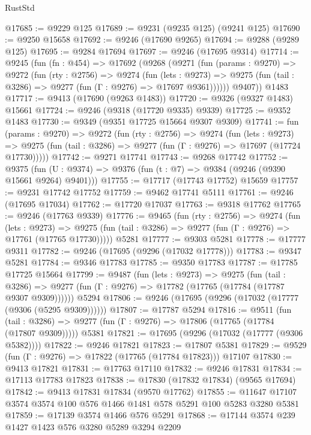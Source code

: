\begin{lexlean}{RustStd}
\begin{coremodule}
@17685 := @9229 @125
@17689 := @9231 (@9235 @125) (@9241 @125)
@17690 := @9250 @15658
@17692 := @9246 (@17690 @9265)
@17694 := @9288 (@9289 @125)
@17695 := @9284 @17694
@17697 := @9246 (@17695 @9314)
@17714 := @9245
    (fun (fn : @454) =>
    @17692
      (@9268
        (@9271
          (fun (params : @9270) =>
          @9272
            (fun (rty : @2756) =>
            @9274
              (fun (lets : @9273) =>
              @9275 (fun (tail : @3286) => @9277 (fun (Γ : @9276) => @17697 @9361))))))
        @9407))
    @1483
@17717 := @9413 (@17690 (@9263 @1483))
@17720 := @9326 (@9327 @1483) @15661
@17724 := @9246 (@9318 (@17720 @9335) @9339)
@17725 := @9352 @1483
@17730 := @9349 (@9351 @17725 @15664 @9307 @9309)
@17741 := fun (params : @9270) =>
  @9272
    (fun (rty : @2756) =>
    @9274
      (fun (lets : @9273) =>
      @9275 (fun (tail : @3286) => @9277 (fun (Γ : @9276) => @17697 (@17724 @17730)))))
@17742 := @9271 @17741
@17743 := @9268 @17742
@17752 := @9375
    (fun (U : @9374) => @9376 (fun (t : @7) => @9384 (@9246 (@9390 @15661 @9264) @9401)))
@17755 := @17717 (@17743 @17752) @15659
@17757 := @9231 @17742 @17752
@17759 := @9462 @17741 @5111
@17761 := @9246 (@17695 @17034)
@17762 := @17720 @17037
@17763 := @9318 @17762
@17765 := @9246 (@17763 @9339)
@17776 := @9465
    (fun (rty : @2756) =>
    @9274
      (fun (lets : @9273) =>
      @9275 (fun (tail : @3286) => @9277 (fun (Γ : @9276) => @17761 (@17765 @17730)))))
    @5281
@17777 := @9303 @5281
@17778 := @17777 @9311
@17782 := @9246 (@17695 (@9296 (@17032 @17778)))
@17783 := @9347 @5281
@17784 := @9346 @17783
@17785 := @9350 @17783
@17787 := @17785 @17725 @15664
@17799 := @9487
    (fun (lets : @9273) =>
    @9275
      (fun (tail : @3286) =>
      @9277 (fun (Γ : @9276) => @17782 (@17765 (@17784 (@17787 @9307 @9309))))))
    @5294
@17806 := @9246 (@17695 (@9296 (@17032 (@17777 (@9306 (@5295 @9309))))))
@17807 := @17787 @5294
@17816 := @9511
    (fun (tail : @3286) => @9277 (fun (Γ : @9276) => @17806 (@17765 (@17784 (@17807 @9309)))))
    @5381
@17821 := @17695 (@9296 (@17032 (@17777 (@9306 @5382))))
@17822 := @9246 @17821
@17823 := @17807 @5381
@17829 := @9529 (fun (Γ : @9276) => @17822 (@17765 (@17784 @17823))) @17107
@17830 := @9413 @17821
@17831 := @17763 @17110
@17832 := @9246 @17831
@17834 := @17113 @17783 @17823
@17838 := @17830 (@17832 @17834) (@9565 @17694)
@17842 := @9413 @17831 @17834 (@9570 @17762)
@17855 := @11647 @17107 @3574 @3574 @100 @576 @1466 @1481 @578 @5291 @100 @5283 @3280 @5381
@17859 := @17139 @3574 @1466 @576 @5291
@17868 := @17144 @3574 @239 @1427 @1423 @576 @3280 @5289 @3294 @2209

\end{coremodule}
\end{lexlean}
